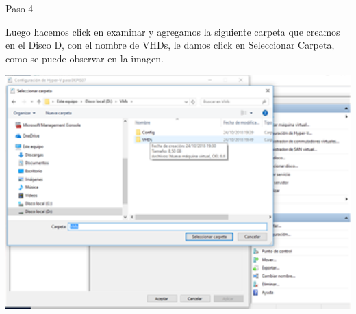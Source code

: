 	\begin{itemize}
	\begin{center}
 	   Paso 4
	\end{center}


   	 Luego hacemos click en examinar y agregamos la siguiente carpeta que creamos en el Disco D, con el nombre de VHDs, le damos click en Seleccionar Carpeta, como se puede observar en la imagen.\\
	\begin{center}
	\includegraphics[width=15cm]{./Imagenes/imagen4} 
	\end{center}


	\end{itemize} 

  
  
  

